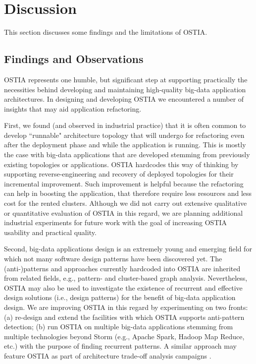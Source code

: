 \documentclass[smallextended]{svjour3}       %
\begin{document}
\section{Discussion}
\label{disc}
%

This section discusses some findings and the limitations of OSTIA.

\subsection{Findings and Observations}

OSTIA represents one humble, but significant step at supporting practically the necessities behind developing and maintaining high-quality big-data application architectures. In designing and developing OSTIA we encountered a number of insights that may aid application refactoring.

First, we found (and observed in industrial practice) that it is often common to develop ``runnable" architecture topology that will undergo for refactoring even after the deployment phase and  while the application is running.
This is mostly the case with big-data applications that are developed stemming from previously existing topologies or applications. OSTIA hardcodes this way of thinking by supporting reverse-engineering and recovery of deployed topologies for their incremental improvement. Such improvement is helpful because 
the refactoring can help in boosting the application, that therefore require less resources and less cost for the rented clusters. Although we did not carry out extensive qualitative or quantitative evaluation of OSTIA in this regard, we are planning additional industrial experiments for future work with the goal of increasing OSTIA usability and practical quality.

Second, big-data applications design is an extremely young and emerging field for which not many software design patterns have been discovered yet. The (anti-)patterns and approaches currently hardcoded into OSTIA are inherited from related fields, e.g., pattern- and cluster-based graph analysis. Nevertheless, OSTIA may also be used to investigate the existence of recurrent and effective design solutions (i.e., design patterns) for the benefit of big-data application design. We are improving OSTIA in this regard by experimenting on two fronts: (a) re-design and extend the facilities with which OSTIA supports anti-pattern detection; (b) run OSTIA on multiple big-data applications stemming from multiple technologies beyond Storm (e.g., Apache Spark, Hadoop Map Reduce, etc.) with the purpose of finding recurrent patterns. A similar approach may feature OSTIA as part of architecture trade-off analysis campaigns \cite{atam}.
\end{document}
